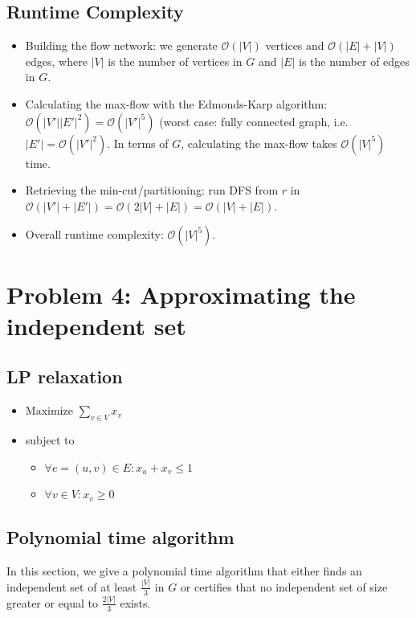 \documentclass[12pt]{article}
\begin{document}
\subsection*{Runtime Complexity}
\begin{itemize}
	\item Building the flow network: we generate $\mathcal{O}(|V|)$ vertices and $\mathcal{O}(|E| + |V|)$ edges, where $|V|$ is the number of vertices in $G$ and $|E|$ is the number of edges in $G$.
	\item Calculating the max-flow with the Edmonds-Karp algorithm: $\mathcal{O}(|V'| |E'|^2)=\mathcal{O}(|V'|^5)$ (worst case: fully connected graph, i.e. $|E'| = \mathcal{O}(|V'|^2)$. In terms of $G$, calculating the max-flow takes $\mathcal{O}(|V|^5)$ time.
	\item Retrieving the min-cut/partitioning: run DFS from $r$ in $\mathcal{O}(|V'| + |E'|) = \mathcal{O}(2|V| + |E|) = \mathcal{O}(|V| + |E|)$.
	\item Overall runtime complexity: $\mathcal{O}(|V|^5)$.
\end{itemize}

\newpage
\section*{Problem 4: Approximating the independent set}
\subsection*{LP relaxation}
\begin{itemize}
	\item $\mbox{Maximize } \sum_{v \in V} x_v$
	\item subject to
	\begin{itemize}
		\item $\forall e=(u,v) \in E: x_u + x_v \leq 1$
		\item $\forall v \in V: x_v \geq 0$
	\end{itemize}
\end{itemize}

\subsection*{Polynomial time algorithm}
In this section, we give a polynomial time algorithm that either finds an independent set of at least $\frac{|V|}{3}$ in $G$ or certifies that no independent set of size greater or equal to $\frac{2 |V|}{3}$ exists.
\end{document}
